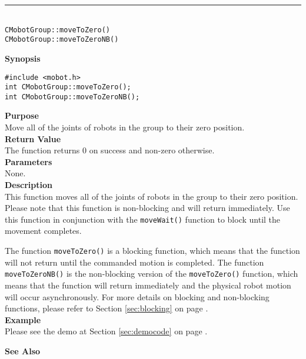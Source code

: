 \noindent
\vspace{5pt}
\rule{4.5in}{0.015in}\\
\noindent
{\LARGE \texttt{CMobotGroup::moveToZero()}}\\
{\LARGE \texttt{CMobotGroup::moveToZeroNB()}}\\
{}

\noindent
{\bf Synopsis}
\vspace{-8pt}
\begin{verbatim}
#include <mobot.h>
int CMobotGroup::moveToZero();
int CMobotGroup::moveToZeroNB();
\end{verbatim}

\noindent
{\bf Purpose}\\
Move all of the joints of robots in the group to their zero position.\\

\noindent
{\bf Return Value}\\
The function returns 0 on success and non-zero otherwise.\\

\noindent
{\bf Parameters}\\
None.\\

\noindent
{\bf Description}\\
This function moves all of the joints of robots in the group to their zero position.
Please note that this function is non-blocking and will return immediately. Use
this function in conjunction with the \texttt{moveWait()} function to block
until the movement completes.

The function \texttt{moveToZero()} is a blocking function, which means that 
the function will not return until the commanded motion is 
completed. The function \texttt{moveToZeroNB()} is the non-blocking version of
the \texttt{moveToZero()} function, which means that the function will return
immediately and the physical robot motion will occur asynchronously. For
more details on blocking and non-blocking functions, please refer to 
Section \ref{sec:blocking} on page \pageref{sec:blocking}.\\

\noindent
{\bf Example}\\
Please see the demo at Section \ref{sec:democode} on page \pageref{sec:democode}.\\
\noindent

\noindent
{\bf See Also}\\

